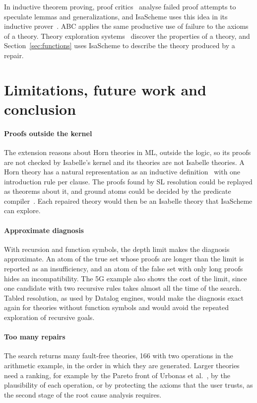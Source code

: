 \documentclass[preprint,12pt]{elsarticle}
\begin{document}
In inductive theorem proving, proof critics~\cite{IrelandBundy96} analyse
failed proof attempts to speculate lemmas and generalizations, and
IsaScheme uses this idea in its inductive prover~\cite{MontanoRivas12}.
ABC applies the same productive use of failure to the axioms of a theory.
Theory exploration
systems~\cite{MontanoRivas12,JohanssonDixonBundy11,ClaessenSmallboneHughes10,Hipster14}
discover the properties of a theory, and Section~\ref{sec:functions} uses
IsaScheme to describe the theory produced by a repair.

\section{Limitations, future work and conclusion}
\label{sec:conclusion}

\paragraph{Proofs outside the kernel}
The extension reasons about Horn theories in ML, outside the logic, so its
proofs are not checked by Isabelle's kernel and its theories are not
Isabelle theories. A Horn theory has a natural representation as an
inductive definition~\cite{Paulson94} with one introduction rule per
clause. The proofs found by SL resolution could be replayed as theorems
about it, and ground atoms could be decided by the predicate
compiler~\cite{BerghoferBulwahnHaftmann09}. Each repaired theory would then
be an Isabelle theory that IsaScheme can explore.

\paragraph{Approximate diagnosis}
With recursion and function symbols, the depth limit makes the diagnosis
approximate. An atom of the true set whose proofs are longer than the limit
is reported as an insufficiency, and an atom of the false set with only
long proofs hides an incompatibility. The 5G example also shows the cost
of the limit, since one candidate with two recursive rules takes almost all
the time of the search. Tabled resolution, as used by Datalog engines,
would make the diagnosis exact again for theories without function symbols
and would avoid the repeated exploration of recursive goals.

\paragraph{Too many repairs}
The search returns many fault-free theories, 166 with two operations in
the arithmetic example, in the order in which they are generated. Larger
theories need a ranking, for example by the Pareto front of Urbonas et
al.~\cite{Urbonas20}, by the plausibility of each operation, or by
protecting the axioms that the user trusts, as the second stage of the root
cause analysis requires.
\end{document}
